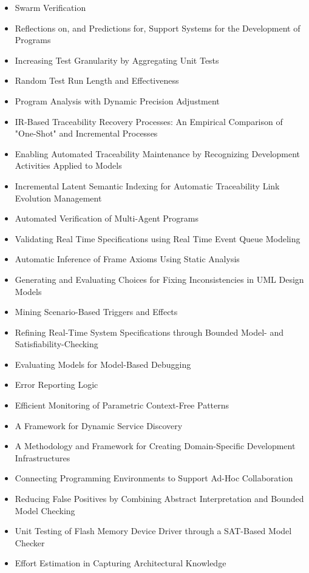 {\small
\begin{itemize}[itemsep=-1ex]
  \item Swarm Verification
  \item Reflections on, and Predictions for, Support Systems for the Development of Programs
  \item Increasing Test Granularity by Aggregating Unit Tests
  \item Random Test Run Length and Effectiveness
  \item Program Analysis with Dynamic Precision Adjustment
  \item IR-Based Traceability Recovery Processes: An Empirical Comparison of "One-Shot" and Incremental Processes
  \item Enabling Automated Traceability Maintenance by Recognizing Development Activities Applied to Models
  \item Incremental Latent Semantic Indexing for Automatic Traceability Link Evolution Management
  \item Automated Verification of Multi-Agent Programs
  \item Validating Real Time Specifications using Real Time Event Queue Modeling
  \item Automatic Inference of Frame Axioms Using Static Analysis
  \item Generating and Evaluating Choices for Fixing Inconsistencies in UML Design Models
  \item Mining Scenario-Based Triggers and Effects
  \item Refining Real-Time System Specifications through Bounded Model- and Satisfiability-Checking
  \item Evaluating Models for Model-Based Debugging
  \item Error Reporting Logic
  \item Efficient Monitoring of Parametric Context-Free Patterns
  \item A Framework for Dynamic Service Discovery
  \item A Methodology and Framework for Creating Domain-Specific Development Infrastructures
  \item Connecting Programming Environments to Support Ad-Hoc Collaboration
  \item Reducing False Positives by Combining Abstract Interpretation and Bounded Model Checking
  \item Unit Testing of Flash Memory Device Driver through a SAT-Based Model Checker
  \item Effort Estimation in Capturing Architectural Knowledge

\end{itemize}}

